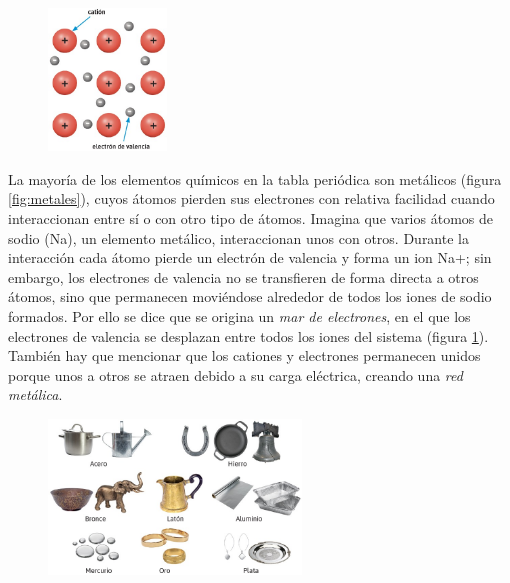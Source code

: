 \documentclass[11pt]{book}
\begin{document}
\begin{figure}
  \centering
  \includegraphics[width=0.28\textwidth]{electron_valencia.jpg}
  \label{fig:electron_valencia}
\end{figure}

La mayoría de los elementos químicos en la tabla periódica son metálicos
(figura \ref{fig:metales}), cuyos átomos pierden sus electrones con relativa facilidad cuando interaccionan
entre sí o con otro tipo de átomos. Imagina que varios átomos de sodio (Na), un elemento metálico, interaccionan
unos con otros. Durante la interacción cada átomo pierde un electrón de valencia y forma un ion Na+; sin embargo,
los electrones de valencia no se transfieren de forma directa a otros átomos, sino que permanecen moviéndose alrededor
de todos los iones de sodio formados. Por ello se dice que se origina un \emph{mar de electrones}, en el
que los electrones de valencia se desplazan entre todos los iones del sistema (figura \ref{fig:electron_valencia}).
También hay que mencionar que los cationes y electrones permanecen unidos porque unos a otros se atraen debido a
su carga eléctrica, creando una \emph{red metálica}.


\begin{figure}[H]
  \centering
  \includegraphics[width=0.6\textwidth]{metalicas.jpg}
  \label{fig:metalicas}
\end{figure}
\end{document}
